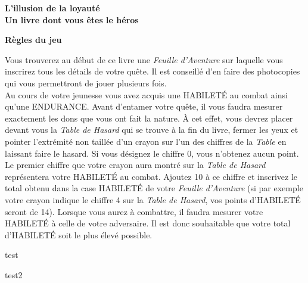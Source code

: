 \documentclass[10pt]{book}
\begin{document}
\frontmatter

\begin{titlepage}
    \begin{center}
        \textbf{\huge L'illusion de la loyauté}\\[0.5cm]
        \textbf{\large Un livre dont vous êtes le héros}\\[2cm]
    \end{center}
\end{titlepage}

\begin{center}
    \textbf{\Large{Règles du jeu}}\\
\end{center}
Vous trouverez au début de ce livre une \textit{Feuille d'Aventure} sur laquelle vous inscrirez
tous les détails de votre quête. Il est conseillé d'en faire des photocopies qui vous permettront de
jouer plusieurs fois.\\

Au cours de votre jeunesse vous avez acquis une HABILETÉ au combat ainsi qu'une ENDURANCE.
Avant d'entamer votre quête, il vous faudra mesurer exactement les dons que vous ont fait la
nature. À cet effet, vous devrez placer devant vous la \textit{Table de Hasard} qui se trouve
à la fin du livre, fermer les yeux et pointer l'extrémité non taillée d'un crayon sur l'un
des chiffres de la \textit{Table} en laissant faire le hasard. Si vous désignez le chiffre
0, vous n'obtenez aucun point.\\

Le premier chiffre que votre crayon aura montré sur la \textit{Table de
Hasard} représentera votre HABILETÉ au combat. Ajoutez 10 à ce
chiffre et inscrivez le total obtenu dans la case HABILETÉ de votre
\textit{Feuille d'Aventure} (si par exemple votre crayon indique le chiffre
4 sur la \textit{Table de Hasard}, vos points d'HABILETÉ seront de 14).
Lorsque vous aurez à combattre, il faudra mesurer votre
HABILETÉ à celle de votre adversaire. Il est donc souhaitable que
votre total d'HABILETÉ soit le plus élevé possible.\\


\mainmatter
\pagestyle{mainmatterstyle}

test

\newpage

test2
\end{document}
